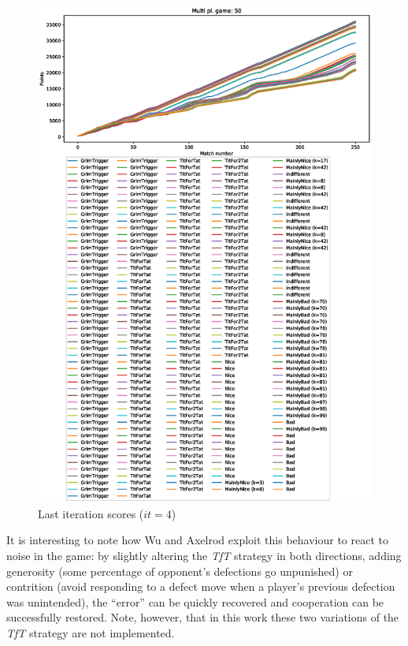 \documentclass[journal,10pt,twoside]{IEEEtran}
\begin{document}
\begin{figure}[!ht]
    \centering
    \includegraphics[width=1\columnwidth]{../img/ripdmp-incr/ripdmp-scores-increasing-pop-50-r4}
    \caption{Last iteration scores ($it=4$)}
    \label{fig:incrLI}
\end{figure}

It is interesting to note how Wu and Axelrod \cite{IPDnoise} exploit this behaviour to react to noise in the game: by slightly altering the \textit{TfT} strategy in both directions, adding generosity (some percentage of opponent's defections go unpunished) or contrition (avoid responding to a defect move when a player's previous defection was unintended), the ``error'' can be quickly recovered and cooperation can be successfully restored. Note, however, that in this work these two variations of the \textit{TfT} strategy are not implemented.
\end{document}
